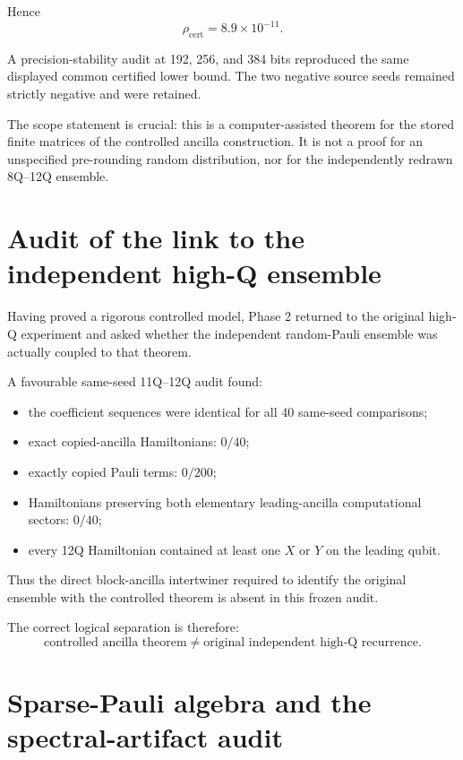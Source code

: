 \documentclass[11pt,a4paper]{article}
\begin{document}
Hence
\[
\boxed{
\rho_{\mathrm{cert}}
=
8.9\times10^{-11}.
}
\]

A precision-stability audit at 192, 256, and 384 bits reproduced the same
displayed common certified lower bound.  The two negative source seeds
remained strictly negative and were retained.

The scope statement is crucial: this is a computer-assisted theorem for the
stored finite matrices of the controlled ancilla construction.  It is not a
proof for an unspecified pre-rounding random distribution, nor for the
independently redrawn 8Q--12Q ensemble.

\section{Audit of the link to the independent high-Q ensemble}

Having proved a rigorous controlled model, Phase 2 returned to the original
high-Q experiment and asked whether the independent random-Pauli ensemble was
actually coupled to that theorem.

A favourable same-seed 11Q--12Q audit found:

\begin{itemize}
\item the coefficient sequences were identical for all 40 same-seed
      comparisons;
\item exact copied-ancilla Hamiltonians:
      \(0/40\);
\item exactly copied Pauli terms:
      \(0/200\);
\item Hamiltonians preserving both elementary leading-ancilla computational
      sectors:
      \(0/40\);
\item every 12Q Hamiltonian contained at least one \(X\) or \(Y\) on the
      leading qubit.
\end{itemize}

Thus the direct block-ancilla intertwiner required to identify the original
ensemble with the controlled theorem is absent in this frozen audit.

The correct logical separation is therefore:
\[
\boxed{
\text{controlled ancilla theorem}
\neq
\text{original independent high-Q recurrence}.
}
\]

\section{Sparse-Pauli algebra and the spectral-artifact audit}
\end{document}
